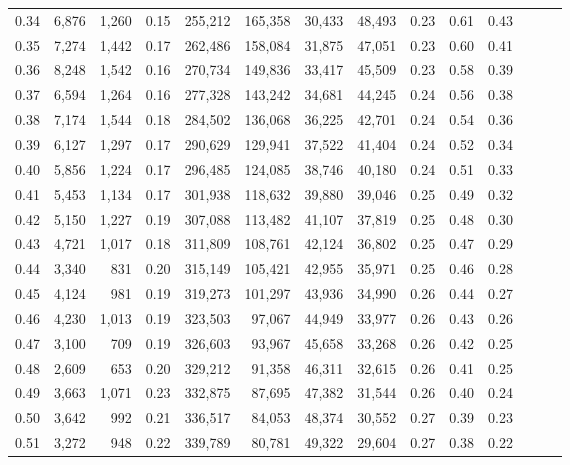 \begin{tabular}{rrrrrrrrrrrrrr}
0.34 &   6,876 &  1,260 &  0.15 &  255,212 &  165,358 &  30,433 &  48,493 &  0.23 &  0.61 &      0.43 \\
0.35 &   7,274 &  1,442 &  0.17 &  262,486 &  158,084 &  31,875 &  47,051 &  0.23 &  0.60 &      0.41 \\
0.36 &   8,248 &  1,542 &  0.16 &  270,734 &  149,836 &  33,417 &  45,509 &  0.23 &  0.58 &      0.39 \\
0.37 &   6,594 &  1,264 &  0.16 &  277,328 &  143,242 &  34,681 &  44,245 &  0.24 &  0.56 &      0.38 \\
0.38 &   7,174 &  1,544 &  0.18 &  284,502 &  136,068 &  36,225 &  42,701 &  0.24 &  0.54 &      0.36 \\
0.39 &   6,127 &  1,297 &  0.17 &  290,629 &  129,941 &  37,522 &  41,404 &  0.24 &  0.52 &      0.34 \\
0.40 &   5,856 &  1,224 &  0.17 &  296,485 &  124,085 &  38,746 &  40,180 &  0.24 &  0.51 &      0.33 \\
0.41 &   5,453 &  1,134 &  0.17 &  301,938 &  118,632 &  39,880 &  39,046 &  0.25 &  0.49 &      0.32 \\
0.42 &   5,150 &  1,227 &  0.19 &  307,088 &  113,482 &  41,107 &  37,819 &  0.25 &  0.48 &      0.30 \\
0.43 &   4,721 &  1,017 &  0.18 &  311,809 &  108,761 &  42,124 &  36,802 &  0.25 &  0.47 &      0.29 \\
0.44 &   3,340 &    831 &  0.20 &  315,149 &  105,421 &  42,955 &  35,971 &  0.25 &  0.46 &      0.28 \\
0.45 &   4,124 &    981 &  0.19 &  319,273 &  101,297 &  43,936 &  34,990 &  0.26 &  0.44 &      0.27 \\
0.46 &   4,230 &  1,013 &  0.19 &  323,503 &   97,067 &  44,949 &  33,977 &  0.26 &  0.43 &      0.26 \\
0.47 &   3,100 &    709 &  0.19 &  326,603 &   93,967 &  45,658 &  33,268 &  0.26 &  0.42 &      0.25 \\
0.48 &   2,609 &    653 &  0.20 &  329,212 &   91,358 &  46,311 &  32,615 &  0.26 &  0.41 &      0.25 \\
0.49 &   3,663 &  1,071 &  0.23 &  332,875 &   87,695 &  47,382 &  31,544 &  0.26 &  0.40 &      0.24 \\
0.50 &   3,642 &    992 &  0.21 &  336,517 &   84,053 &  48,374 &  30,552 &  0.27 &  0.39 &      0.23 \\
0.51 &   3,272 &    948 &  0.22 &  339,789 &   80,781 &  49,322 &  29,604 &  0.27 &  0.38 &      0.22 \\

\end{tabular}
